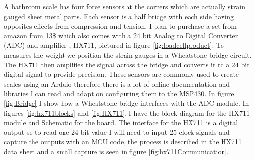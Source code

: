 \documentclass[11pt]{article}
\begin{document}
A bathroom scale has four force sensors at the corners which are actually strain gauged sheet metal parts.
Each sensor is a half bridge with each side having opposites effects from compression and tension. 
I plan to purchase a set from amazon from 13\$ which also comes with a 24 bit Analog to Digital Converter (ADC) and amplifier , HX711, pictured in figure \ref{fig:loadcellproduct}. 
To measures the weight we position the strain gauges in a Wheatstone bridge circuit. 
The HX711 then amplifies the signal across the bridge and converts it to a 24 bit digital signal to provide precision.
These sensors are commonly used to create scales using an Arduio therefore there is a lot of online documentation and libraries I can read and adapt on configuring them to the MSP430. 
In figure \ref{fig:Bridge} I show how a Wheatstone bridge interfaces with the ADC module.
In figures \ref{fig:hx711blocks} and \ref{fig:HX711}, I have the block diagram for the HX711 module and Schematic for the board.
The interface for the HX711 is a digital output so to read one 24 bit value I will need to input 25 clock signals and capture the outputs with an MCU code, the process is described in the HX711 data sheet and a small capture is seen in figure \ref{fig:hx711Communication}.\\
\end{document}
